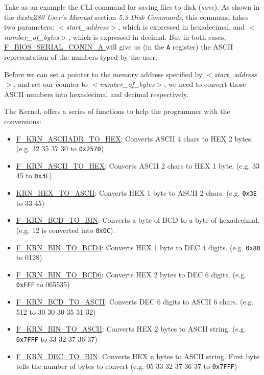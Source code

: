 \documentclass[a4paper,11pt]{article}
\begin{document}
    Take as an example the CLI command for saving files to disk (\textit{save}).
    As shown in the \textit{dastaZ80 User's Manual} section \textit{5.3 Disk
    Commands}, this command takes two parameters: \textit{$<$start\_address$>$},
    which is expressed in hexadecimal, and \textit{$<$number\_of\_bytes$>$}, which
    is expressed in decimal. But in both cases,
    \hyperref[func:fbiosserialconina]{F\_BIOS\_SERIAL\_CONIN\_A } will give
    us (in the \texttt{A} register) the ASCII representation of the numbers typed
    by the user.

    Before we can set a pointer to the memory address specified by 
    \textit{$<$start\_address$>$}, and set our counter to 
    \textit{$<$number\_of\_bytes$>$}, we need to convert those ASCII numbers
    into hexadecimal and decimal respectively.

    The Kernel, offers a series of functions to help the programmer with the
    conversions:

    \begin{itemize}
        \item \hyperref[func:fkrnasciiadrtohex]{F\_KRN\_ASCIIADR\_TO\_HEX}:
        Converts ASCII 4 chars to HEX 2 bytes. (e.g. 32 35 37 30 to \texttt{0x2570})
        \item \hyperref[func:fkrnasciitohex]{F\_KRN\_ASCII\_TO\_HEX}: Converts
        ASCII 2 chars to HEX 1 byte. (e.g. 33 45 to \texttt{0x3E})
        \item \hyperref[func:fkrnhextoascii]{KRN\_HEX\_TO\_ASCII}: Converts
        HEX 1 byte to ASCII 2 chars. (e.g. \texttt{0x3E} to 33 45)
        \item \hyperref[func:fkrnbcdtobin]{F\_KRN\_BCD\_TO\_BIN}: Converts a
        byte of BCD to a byte of hexadecimal. (e.g. 12 is converted into \texttt{0x0C}).
        \item \hyperref[func:fkrnbintobcd4]{F\_KRN\_BIN\_TO\_BCD4}: Converts HEX
        1 byte to DEC 4 digits. (e.g. \texttt{0x80} to 0128)
        \item \hyperref[func:fkrnbintobcd6]{F\_KRN\_BIN\_TO\_BCD6}: Converts HEX
        2 bytes to DEC 6 digits. (e.g. \texttt{0xFFF} to 065535)
        \item \hyperref[func:fkrnbcdtoascii]{F\_KRN\_BCD\_TO\_ASCII}: Converts
        DEC 6 digits to ASCII 6 chars. (e.g. 512 to 30 30 30 35 31 32)
        \item \hyperref[func:fkrnbintoascii]{F\_KRN\_BIN\_TO\_ASCII}: Converts
        HEX 2 bytes to ASCII string. (e.g. \texttt{0x7FFF} to 33 32 37 36 37)
        \item \hyperref[func:fkrndectobin]{F\_KRN\_DEC\_TO\_BIN}:
        Converts HEX n bytes to ASCII string. First byte tells the number of
        bytes to convert (e.g. 05 33 32 37 36 37 to \texttt{0x7FFF})
    \end{itemize}
\end{document}
